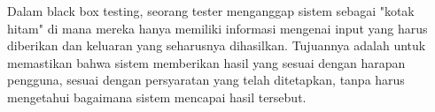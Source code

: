 Dalam black box testing, seorang tester menganggap sistem sebagai "kotak hitam" di mana mereka hanya memiliki informasi mengenai input yang harus diberikan dan keluaran yang seharusnya dihasilkan. Tujuannya adalah untuk memastikan bahwa sistem memberikan hasil yang sesuai dengan harapan pengguna, sesuai dengan persyaratan yang telah ditetapkan, tanpa harus mengetahui bagaimana sistem mencapai hasil tersebut.
		


